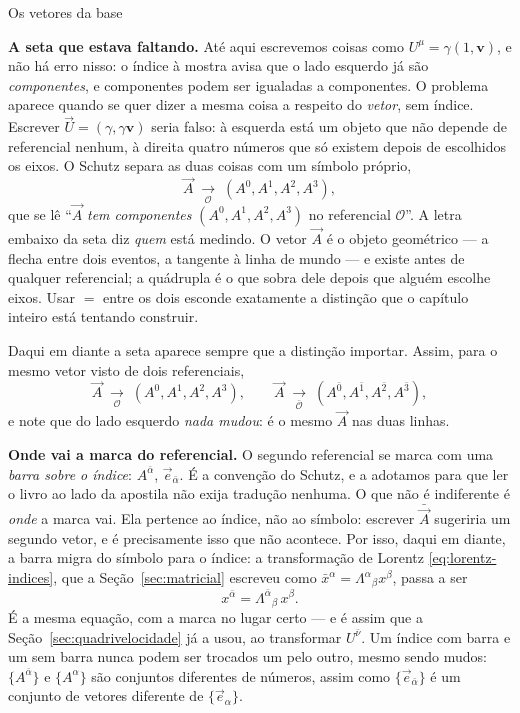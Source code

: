 \documentclass[12pt,a4paper,oneside]{book}
\theoremstyle{rgplain}
\theoremstyle{rgremark}
\newcommand{\obs}{\mathcal{O}}
\newcommand{\obsl}{\bar{\mathcal{O}}}
\newcommand{\temcomp}[1]{\;\underset{#1}{\longrightarrow}\;}
\begin{document}
{}
\label{sec:vetores-base}

\begin{interludio}{Os vetores da base}

\textbf{A seta que estava faltando.} Até aqui escrevemos coisas como
$U^\mu=\gamma(1,\bm v)$, e não há erro nisso: o índice à mostra avisa que o
lado esquerdo já são \emph{componentes}, e componentes podem ser igualadas a
componentes. O problema aparece quando se quer dizer a mesma coisa a respeito
do \emph{vetor}, sem índice. Escrever $\vec U=(\gamma,\gamma\bm v)$ seria
falso: à esquerda está um objeto que não depende de referencial nenhum, à
direita quatro números que só existem depois de escolhidos os eixos. O Schutz
separa as duas coisas com um símbolo próprio,
\[
  \vec A \temcomp{\obs} (A^0,A^1,A^2,A^3),
\]
que se lê ``$\vec A$ \emph{tem componentes} $(A^0,A^1,A^2,A^3)$ no referencial
$\obs$''. A letra embaixo da seta diz \emph{quem} está medindo. O vetor
$\vec A$ é o objeto geométrico --- a flecha entre dois eventos, a tangente à
linha de mundo --- e existe antes de qualquer referencial; a quádrupla é o que
sobra dele depois que alguém escolhe eixos. Usar $=$ entre os dois esconde
exatamente a distinção que o capítulo inteiro está tentando construir.

Daqui em diante a seta aparece sempre que a distinção importar. Assim, para o
mesmo vetor visto de dois referenciais,
\[
  \vec A \temcomp{\obs} (A^0,A^1,A^2,A^3),
  \qquad
  \vec A \temcomp{\obsl} (A^{\bar 0},A^{\bar 1},A^{\bar 2},A^{\bar 3}),
\]
e note que do lado esquerdo \emph{nada mudou}: é o mesmo $\vec A$ nas duas
linhas.

\textbf{Onde vai a marca do referencial.} O segundo referencial se marca com
uma \emph{barra sobre o índice}: $A^{\bar\alpha}$, $\vec e_{\bar\alpha}$. É a
convenção do Schutz, e a adotamos para que ler o livro ao lado da apostila não
exija tradução nenhuma. O que não é indiferente é \emph{onde} a marca vai. Ela
pertence ao índice, não ao símbolo: escrever $\bar{\vec A}$ sugeriria um segundo
vetor, e é precisamente isso que não acontece. Por isso, daqui em diante, a
barra migra do símbolo para o índice: a transformação de Lorentz \eqref{eq:lorentz-indices},
que a Seção~\ref{sec:matricial} escreveu como
$\bar x^{\alpha}=\Lambda^{\alpha}{}_{\beta}x^{\beta}$, passa a ser
\[
  x^{\bar\alpha}=\Lambda^{\bar\alpha}{}_{\beta}\,x^{\beta} .
\]
É a mesma equação, com a marca no lugar certo --- e é assim que a
Seção~\ref{sec:quadrivelocidade} já a usou, ao transformar $U^{\bar\nu}$. Um
índice com barra e um sem barra nunca podem ser trocados um pelo outro, mesmo
sendo mudos: $\{A^{\bar\alpha}\}$ e $\{A^\alpha\}$ são conjuntos diferentes de
números, assim como $\{\vec e_{\bar\alpha}\}$ é um conjunto de vetores diferente
de $\{\vec e_\alpha\}$.


\end{interludio}
\end{document}
